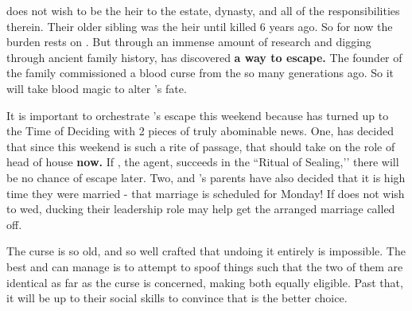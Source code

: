 \documentclass[green]{GL2020}
\begin{document}
\name{\gFaledonHeir{}}

\cHeir{\full} does not wish to be the heir to the \cFaledonParent{\formal} estate, dynasty, and all of the responsibilities therein. Their older sibling \cHeirSibling{\full} was the heir until \cHeirSibling{\they} \cHeirSibling{\were} killed 6 years ago. So for now the burden rests on \cHeir{}. But through an immense amount of research and digging through ancient family history, \cHeir{} has discovered \textbf{a way to escape.} The founder of the \cFaledonParent{\formal} family commissioned a blood curse from the \pFarm{} so many generations ago. So it will take blood magic to alter \cHeir{}’s fate. 

It is important to orchestrate \cHeir{}’s escape this weekend because \cDiplomat{\full} has turned up to the Time of Deciding with 2 pieces of truly abominable news. One, \cFaledonParent{\full} has decided that since this weekend is such a rite of passage, that \cHeir{} should take on the role of head of house \textbf{now.} If \cDiplomat{}, the \cFaledonParent{\formal} agent, succeeds in the ``Ritual of Sealing,’’ there will be no chance of escape later. Two, \cHeir{} and \cChupStudent{\full}’s parents have also decided that it is high time they were married - that marriage is scheduled for Monday! If \cHeir{} does not wish to wed, ducking their leadership role may help get the arranged marriage called off.

The curse is so old, and so well crafted that undoing it entirely is impossible. The best \cHeir{} and \cAmbition{\full} can manage is to attempt to spoof things such that the two of them are identical as far as the curse is concerned, making both equally eligible. Past that, it will be up to their social skills to convince \cDiplomat{} that \cAmbition{} is the better choice.
\end{document}
